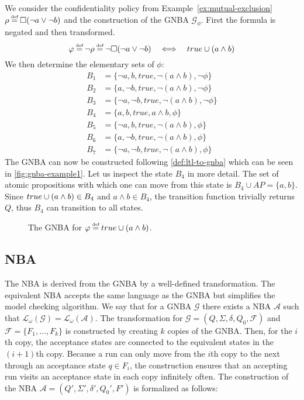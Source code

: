 \begin{example}
We consider the confidentiality policy from Example~\ref{ex:mutual-exclusion} $\conf \eqdef \G(\lnot a \lor \lnot b)$ and the construction of the GNBA $\mathcal{G}_\phi$. First the formula is negated and then transformed.
\begin{equation*}
    \phi \eqdef \lnot \conf \eqdef \lnot \G(\lnot a \lor \lnot b) \quad\Longleftrightarrow\quad true \U (a \land b)
\end{equation*}
We then determine the elementary sets of $\phi$:
\begin{align*}
    B_1 &= \{\lnot a, b, true, \lnot(a \land b), \lnot\phi\} \\
    B_2 &= \{a, \lnot b, true, \lnot(a \land b), \lnot\phi\} \\
    B_3 &= \{\lnot a, \lnot b, true, \lnot(a \land b), \lnot\phi\} \\
    B_4 &= \{a, b, true, a \land b, \phi\} \\
    B_5 &= \{\lnot a, b, true, \lnot(a \land b), \phi\} \\
    B_6 &= \{a, \lnot b, true, \lnot(a \land b), \phi\} \\
    B_7 &= \{\lnot a, \lnot b, true, \lnot(a \land b), \phi\}
\end{align*}
The GNBA can now be constructed following \autoref{def:ltl-to-gnba} which can be seen in \autoref{fig:gnba-example1}. Let us inspect the state $B_4$ in more detail. The set of atomic propositions with which one can move from this state is $B_4 \cup AP = \{a,b\}$. Since $true \cup (a \land b) \in B_4$ and $a \land b \in B_4$, the transition function trivially returns $Q$, thus $B_4$ can transition to all states.

\begin{figure}[!ht]
    \centering
    
    \caption{The GNBA for $\phi \eqdef true\U (a \land b)$.}
    \label{fig:gnba-example1}
\end{figure}
\end{example}

\subsection{NBA}\label{sec:nba}
The NBA is derived from the GNBA by a well-defined transformation. The equivalent NBA accepts the same language as the GNBA but simplifies the model checking algorithm. We say that for a GNBA $\mathcal{G}$ there exists a NBA $\mathcal{A}$ such that $\mathcal{L}_\omega(\mathcal{G})=\mathcal{L}_\omega(\mathcal{A})$. The transformation for $\mathcal{G}=(Q,\Sigma,\delta,Q_0,\mathcal{F})$ and $\mathcal{F}=\{F_1,\ldots,F_k\}$ is constructed by creating $k$ copies of the GNBA. Then, for the $i$th copy, the acceptance states are connected to the equivalent states in the $(i+1)$th copy. Because a run can only move from the $i$th copy to the next through an acceptance state $q \in F_i$, the construction ensures that an accepting run visits an acceptance state in each copy infinitely often. The construction of the NBA $\mathcal{A}=(Q',\Sigma',\delta',Q_0',F')$ is formalized as follows:

